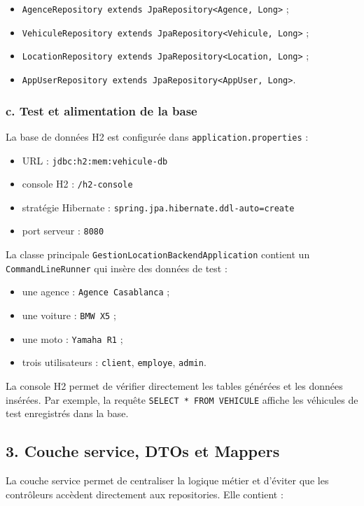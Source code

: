 \documentclass[12pt,a4paper]{article}
\newcommand{\code}[1]{\texttt{#1}}
\newcommand{\question}[1]{\subsection*{#1}}
\begin{document}
\begin{itemize}
    \item \code{AgenceRepository extends JpaRepository<Agence, Long>} ;
    \item \code{VehiculeRepository extends JpaRepository<Vehicule, Long>} ;
    \item \code{LocationRepository extends JpaRepository<Location, Long>} ;
    \item \code{AppUserRepository extends JpaRepository<AppUser, Long>}.
\end{itemize}

\subsubsection*{c. Test et alimentation de la base}

La base de données H2 est configurée dans \code{application.properties} :

\begin{itemize}
    \item URL : \code{jdbc:h2:mem:vehicule-db}
    \item console H2 : \code{/h2-console}
    \item stratégie Hibernate : \code{spring.jpa.hibernate.ddl-auto=create}
    \item port serveur : \code{8080}
\end{itemize}

La classe principale \code{GestionLocationBackendApplication} contient un \code{CommandLineRunner} qui insère des données de test :

\begin{itemize}
    \item une agence : \code{Agence Casablanca} ;
    \item une voiture : \code{BMW X5} ;
    \item une moto : \code{Yamaha R1} ;
    \item trois utilisateurs : \code{client}, \code{employe}, \code{admin}.
\end{itemize}

La console H2 permet de vérifier directement les tables générées et les données insérées.
Par exemple, la requête \code{SELECT * FROM VEHICULE} affiche les véhicules de test enregistrés dans la base.

\question{3. Couche service, DTOs et Mappers}

La couche service permet de centraliser la logique métier et d'éviter que les contrôleurs accèdent directement aux repositories.
Elle contient :
\end{document}

